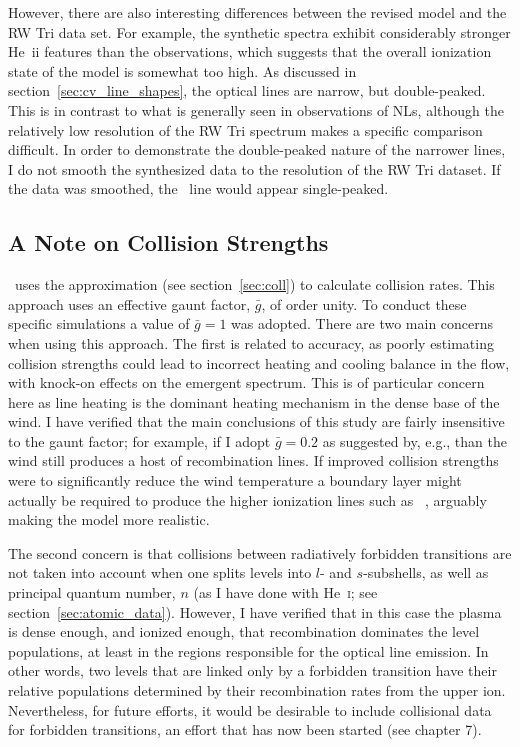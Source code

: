 However, there are also interesting differences between the revised
model and the RW Tri data set. For example, the synthetic spectra exhibit
considerably stronger He~{\sc ii} features than the observations,
which suggests that the overall ionization state of the model is
somewhat too high. As discussed in section~\ref{sec:cv_line_shapes}, 
the optical lines are narrow, but double-peaked. 
This is in contrast to what is generally seen in observations
of NLs, although the relatively low resolution of the RW Tri
spectrum makes a specific comparison difficult. In order to demonstrate
the double-peaked nature of the narrower lines, I do not 
smooth the synthesized data to the resolution of the RW Tri dataset.
If the data was smoothed, the \ha\ line would appear single-peaked.

\subsection{A Note on Collision Strengths}
\label{sec:coll_bl}

\py\ uses the \cite{vanregemorter} approximation 
(see section~\ref{sec:coll}) to calculate collision rates.
This approach uses an effective gaunt factor, $\bar{g}$, of
order unity. To conduct these specific simulations a value of $\bar{g}=1$ 
was adopted. There are two main concerns when using this approach.
The first is related to accuracy, as poorly estimating collision strengths
could lead to incorrect heating and cooling balance in the flow, with
knock-on effects on the emergent spectrum. This is of particular concern
here as line heating is the dominant heating mechanism in the dense 
base of the wind. I have verified that the main conclusions of this study
are fairly insensitive to the gaunt factor; for example, if I adopt
$\bar{g}=0.2$ as suggested by, e.g., \cite{ferland2005} than the wind still
produces a host of recombination lines. 
If improved collision strengths were to significantly reduce the wind temperature
a boundary layer might
actually be required to produce the higher ionization lines such as 
\heiiopt\ \citep[see e.g.][]{hoare1991}, arguably making the model
more realistic.

The second concern is that 
collisions between radiatively forbidden transitions are not taken into 
account when one splits levels into $l$- and $s$-subshells, as well
as principal quantum number, $n$ (as I have done with He~\textsc{i}; 
see section~\ref{sec:atomic_data}). However, I have verified that
in this case the plasma is dense enough, and ionized enough, 
that recombination dominates the level populations, at least in 
the regions responsible for the optical line emission. In other words, two levels
that are linked only by a forbidden transition have their relative populations
determined by their recombination rates from the upper ion.
Nevertheless, for future efforts, it would be desirable to include
collisional data for forbidden transitions, an effort that has now
been started (see chapter 7).



